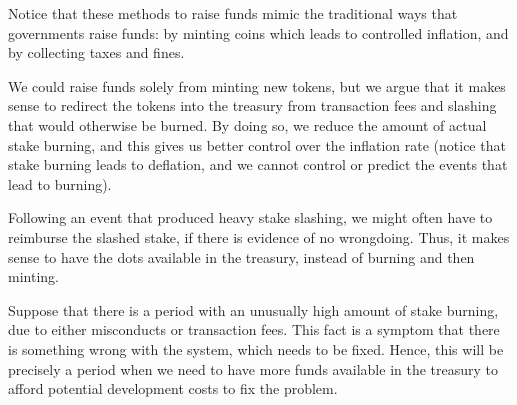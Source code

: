  
Notice that these methods to raise funds mimic the traditional ways that governments raise funds: by minting coins which leads to controlled inflation, and by collecting taxes and fines.

We could raise funds solely from minting new tokens, but we argue that it makes sense to redirect the tokens into the treasury from transaction fees and slashing that would otherwise be burned.
By doing so, we reduce the amount of actual stake burning, and this gives us better control over the inflation rate (notice that stake burning leads to deflation, and we cannot control or predict the events that lead to burning).

Following an event that produced heavy stake slashing, we might often have to reimburse the slashed stake, if there is evidence of no wrongdoing. Thus, it makes sense to have the dots available in the treasury, instead of burning and then minting.

Suppose that there is a period with an unusually high amount of stake burning, due to either misconducts or transaction fees. This fact is a symptom that there is something wrong with the system, which needs to be fixed. Hence, this will be precisely a period when we need to have more funds available in the treasury to afford potential development costs to fix the problem.


